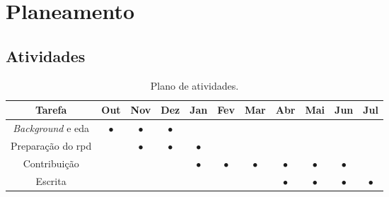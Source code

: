 \chapter{Planeamento}

\section{Atividades}


\begin{table}[H]
\begin{center}
\begin{tabular}{| c | c | c | c | c | c | c | c | c | c | c |}
\hline
\textbf{Tarefa} & \textbf{Out} & \textbf{Nov} & \textbf{Dez} & \textbf{Jan} & \textbf{Fev} & \textbf{Mar} & \textbf{Abr} & \textbf{Mai} & \textbf{Jun} & \textbf{Jul}\\
\hline
\textit{Background} e \acrshort{eda} & $\bullet$ & $\bullet$ & $\bullet$ & & & & & & & \\
\hline
Preparação do \acrshort{rpd} & & $\bullet$ & $\bullet$ & $\bullet$ & & & & & & \\
\hline
Contribuição & & & &$\bullet$ &$\bullet$ &$\bullet$ &$\bullet$ &$\bullet$ &$\bullet$ & \\
\hline
Escrita & & & & & & & $\bullet$ & $\bullet$ & $\bullet$ & $\bullet$ \\
\hline
\end{tabular}
\end{center}
\caption{Plano de atividades.}
\end{table}

